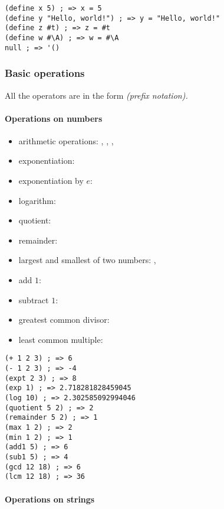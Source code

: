 \documentclass[a4paper,landscape,10pt]{article}
\begin{document}
\begin{multicols*}{2}
  \begin{lstlisting}[language=Racket]
(define x 5) ; => x = 5
(define y "Hello, world!") ; => y = "Hello, world!"
(define z #t) ; => z = #t
(define w #\A) ; => w = #\A
null ; => '()
\end{lstlisting}

  \subsubsection{Basic operations}

  All the operators are in the form  \textit{(prefix notation).}

  \paragraph{Operations on numbers}

  \begin{itemize}
    \item arithmetic operations: \iracket{+}, \iracket{-}, \iracket{*}, \iracket{/}
    \item exponentiation: 
    \item exponentiation by $e$: 
    \item logarithm: 
    \item quotient: 
    \item remainder: 
    \item largest and smallest of two numbers: , 
    \item add \(1\): 
    \item subtract \(1\): 
    \item greatest common divisor: 
    \item least common multiple: 
  \end{itemize}

  \begin{lstlisting}[language=Racket]
(+ 1 2 3) ; => 6
(- 1 2 3) ; => -4
(expt 2 3) ; => 8
(exp 1) ; => 2.718281828459045
(log 10) ; => 2.302585092994046
(quotient 5 2) ; => 2
(remainder 5 2) ; => 1
(max 1 2) ; => 2
(min 1 2) ; => 1
(add1 5) ; => 6
(sub1 5) ; => 4
(gcd 12 18) ; => 6
(lcm 12 18) ; => 36
\end{lstlisting}

  \paragraph{Operations on strings}


\end{multicols*}
\end{document}
